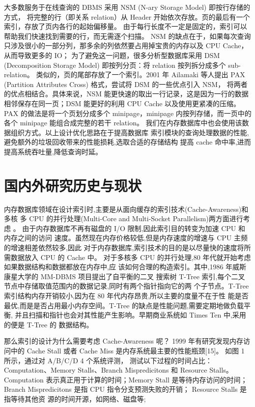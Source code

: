 大多数服务于在线查询的 DBMS 采用 NSM (N-ary Storage Model) 即按行存储的方式，
将完整的行（即关系 relation）从 Header 开始依次存放。页的最后有一个索引，存放了页内各行的起始偏移量。
由于每行长度不一定是固定的，索引可以帮助我们快速找到需要的行，而无需逐个扫描。
NSM 的缺点在于，如果每次查询只涉及很小的一部分列，那多余的列依然要占用掉宝贵的内存以及 CPU Cache，从而导致更多的 IO；
为了避免这一问题，很多分析型数据库采用 DSM (Decomposition Storage Model) 即按列分页：将 relation 按列拆分成多个 sub-relation。
类似的，页的尾部存放了一个索引。2001 年 Ailamaki 等人提出 PAX (Partition Attributes Cross) 格式，尝试将 DSM 的一些优点引入 NSM，
将两者的优点相结合。具体来说，NSM 能更快速的取出一行记录，这是因为一行的数据相邻保存在同一页；DSM 能更好的利用 CPU Cache 以及使用更紧凑的压缩。
PAX 的做法是将一个页划分成多个 minipage，minipage 内按列存储，而一页中的各个 minipage 能组合成完整的若干 relation。
我们在内存数据库中也会使用该数据组织方式。以上设计优化思路在于提高数据库
索引模块的查询处理数据的性能,避免额外的垃圾回收带来的性能损耗,选取合适的存储结构
提高 cache 命中率,进而提高系统吞吐量,降低查询时延。

\section{国内外研究历史与现状}

内存数据库领域在设计索引时,主要是从面向缓存的索引技术(Cache-Awareness)和多核
多 CPU 的并行处理(Multi-Core and Multi-Socket Parallelism)两方面进行考虑\cite{lim2017cicada}
\cite{neumann2015fast}
\cite{nam2019write}。
由于内存数据库不再有磁盘的 I/O 限制,因此索引目的转变为加速 CPU 和内存之间的访问
速度。虽然现在内存价格较低,但是内存速度的增速与 CPU 主频的增速相差依然较多,因此
对于内存数据库,索引技术的目的是以尽量快的速度将所需数据放入 CPU 的 Cache 中。
对于多核多 CPU 的并行处理,80 年代就开始考虑如果数据结构和数据都放在内存中,应
该如何合理的构造索引。其中,1986 年威斯康星大学的 MM-DBMS 项目提出了自平衡的二叉
搜索树 T-Tree 索引,每个二叉节点中存储取值范围内的数据记录,同时有两个指针指向它的两
个子节点。T-Tree 索引结构内存开销较小,因为在 80 年代内存昂贵,所以主要的度量不在于性
能是否最优,而是是否占用最小内存空间。T-Tree 的缺点是性能问题,需要定期地做负载平衡,
并且扫描和指针也会对其性能产生影响。早期商业系统如 Times Ten 中,采用的便是 T-Tree 的
数据结构。

那么索引的设计为什么需要考虑 Cache-Awareness 呢？
1999 年有研究发现内存访问中的 Cache Stall 或者 Cache Miss 是内存系统最主要的性能瓶颈[15]。
如图 1 所示，通过对 A/B/C/D 4 个系统评测，
测试以下过程的时间占比：Computation、Memory Stalls、Branch Mispredicitons 和 Resource Stalls。
Computation 表示真正用于计算的时间；Memory Stall 是等待内存访问的时间；
Branch Mispredicitons 是指 CPU 指令分支预测失败的开销；
Resource Stalls 是指等待其他资 源的时间开源，如网络、磁盘等;

